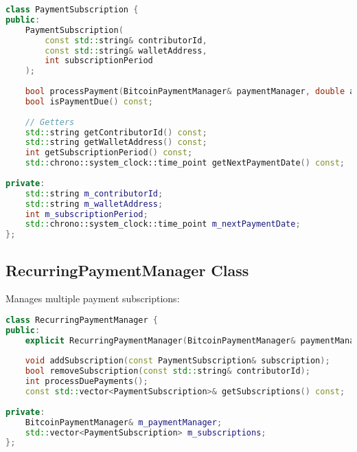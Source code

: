\documentclass[11pt,a4paper]{report}
\begin{document}
\begin{lstlisting}[language=C++]
class PaymentSubscription {
public:
    PaymentSubscription(
        const std::string& contributorId,
        const std::string& walletAddress,
        int subscriptionPeriod
    );
    
    bool processPayment(BitcoinPaymentManager& paymentManager, double amount);
    bool isPaymentDue() const;
    
    // Getters
    std::string getContributorId() const;
    std::string getWalletAddress() const;
    int getSubscriptionPeriod() const;
    std::chrono::system_clock::time_point getNextPaymentDate() const;
    
private:
    std::string m_contributorId;
    std::string m_walletAddress;
    int m_subscriptionPeriod;
    std::chrono::system_clock::time_point m_nextPaymentDate;
};
\end{lstlisting}

\subsection{RecurringPaymentManager Class}
Manages multiple payment subscriptions:

\begin{lstlisting}[language=C++]
class RecurringPaymentManager {
public:
    explicit RecurringPaymentManager(BitcoinPaymentManager& paymentManager);
    
    void addSubscription(const PaymentSubscription& subscription);
    bool removeSubscription(const std::string& contributorId);
    int processDuePayments();
    const std::vector<PaymentSubscription>& getSubscriptions() const;
    
private:
    BitcoinPaymentManager& m_paymentManager;
    std::vector<PaymentSubscription> m_subscriptions;
};
\end{lstlisting}
\end{document}
